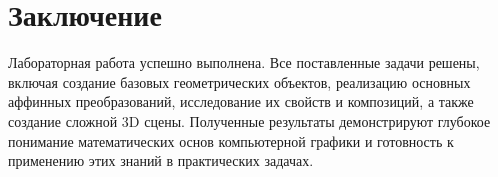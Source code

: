 \section*{Заключение}

Лабораторная работа успешно выполнена. Все поставленные задачи решены, включая создание базовых геометрических объектов, реализацию основных аффинных преобразований, исследование их свойств и композиций, а также создание сложной 3D сцены. Полученные результаты демонстрируют глубокое понимание математических основ компьютерной графики и готовность к применению этих знаний в практических задачах.
